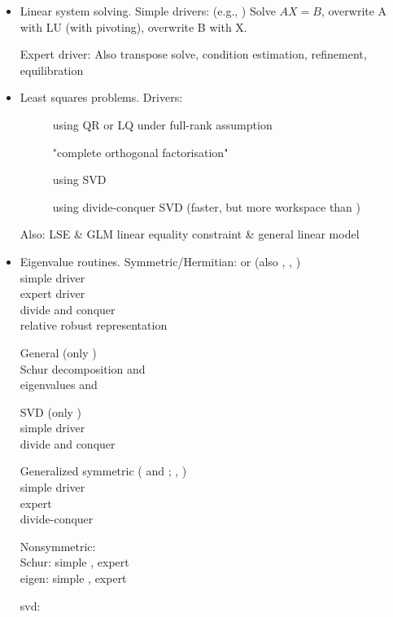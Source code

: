 \begin{itemize}
\item Linear system solving.
Simple drivers:  (e.g., ) 
Solve $AX=B$, overwrite A with LU (with pivoting),
overwrite B with X.

Expert driver: 
Also transpose solve, condition estimation, refinement, equilibration
\item Least squares problems.
Drivers: 
\begin{description}
\item[] using QR or LQ under full-rank assumption
\item[] "complete orthogonal factorisation"
\item[] using SVD
\item[] using divide-conquer SVD
(faster, but more workspace than )
\end{description}

Also: LSE \& GLM linear equality constraint \& general linear model

\item Eigenvalue routines.
Symmetric/Hermitian:  or  (also , , )\\
simple driver \\
expert driver \\
divide and conquer \\
relative robust representation 

General (only )\\
Schur decomposition  and \\
eigenvalues  and 

SVD (only )\\
simple driver \\
divide and conquer 

Generalized symmetric ( and ; , )\\
simple driver \\
expert \\
divide-conquer 

Nonsymmetric:\\
Schur: simple , expert \\
eigen: simple , expert 

svd: 

\end{itemize}

